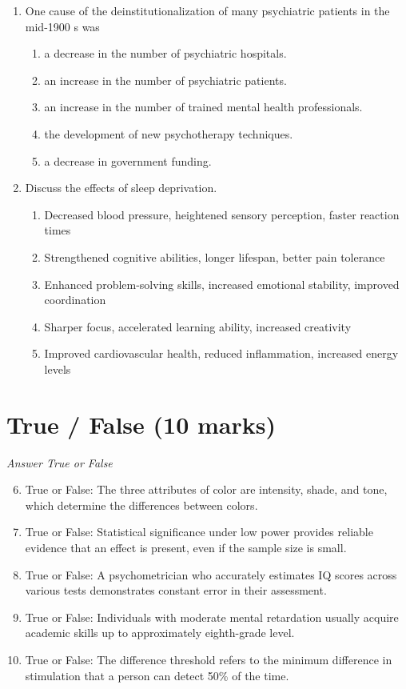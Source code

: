 \documentclass[12pt]{article}
\begin{document}
\begin{enumerate}[label=\arabic*.]
\begin{enumerate}[label=(\alph*)]
\end{enumerate}
\item One cause of the deinstitutionalization of many psychiatric patients in the mid-1900 s was
\begin{enumerate}[label=(\alph*)]
    \item a decrease in the number of psychiatric hospitals.
    \item an increase in the number of psychiatric patients.
    \item an increase in the number of trained mental health professionals.
    \item the development of new psychotherapy techniques.
    \item a decrease in government funding.
\end{enumerate}
\item Discuss the effects of sleep deprivation.
\begin{enumerate}[label=(\alph*)]
    \item Decreased blood pressure, heightened sensory perception, faster reaction times
    \item Strengthened cognitive abilities, longer lifespan, better pain tolerance
    \item Enhanced problem-solving skills, increased emotional stability, improved coordination
    \item Sharper focus, accelerated learning ability, increased creativity
    \item Improved cardiovascular health, reduced inflammation, increased energy levels
\end{enumerate}
\end{enumerate}

\section*{True / False (10 marks)}
\textit{Answer True or False}
\begin{enumerate}[label=\arabic*.]
\setcounter{enumi}{5}
\item True or False: The three attributes of color are intensity, shade, and tone, which determine the differences between colors.
\item True or False: Statistical significance under low power provides reliable evidence that an effect is present, even if the sample size is small.
\item True or False: A psychometrician who accurately estimates IQ scores across various tests demonstrates constant error in their assessment.
\item True or False: Individuals with moderate mental retardation usually acquire academic skills up to approximately eighth-grade level.
\item True or False: The difference threshold refers to the minimum difference in stimulation that a person can detect 50\% of the time.
\end{enumerate}
\end{document}
